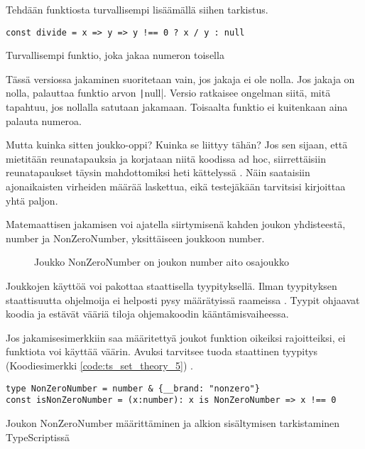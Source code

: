 Tehdään funktiosta turvallisempi lisäämällä siihen tarkistus.


\begin{code}
    \begin{verbatim}
const divide = x => y => y !== 0 ? x / y : null
\end{verbatim}
    \caption{Turvallisempi funktio, joka jakaa numeron toisella}
    \label{code:ts_set_theory_4}
\end{code}

Tässä versiossa jakaminen suoritetaan vain, jos jakaja ei ole nolla. Jos jakaja on nolla, palauttaa funktio arvon \texttt|null|. Versio ratkaisee ongelman siitä, mitä tapahtuu, jos nollalla satutaan jakamaan. Toisaalta funktio ei kuitenkaan aina palauta numeroa.

Mutta kuinka sitten joukko-oppi? Kuinka se liittyy tähän? Jos sen sijaan, että mietitään reunatapauksia ja korjataan niitä koodissa ad hoc, siirrettäisiin reunatapaukset täysin mahdottomiksi heti kättelyssä \cite{impossiblebetter}. Näin saataisiin ajonaikaisten virheiden määrää laskettua, eikä testejäkään tarvitsisi kirjoittaa yhtä paljon.

Matemaattisen jakamisen voi ajatella siirtymisenä kahden joukon yhdisteestä, number ja NonZeroNumber, yksittäiseen joukkoon number.

\begin{figure}[ht]
    \centering
    \caption{Joukko NonZeroNumber on joukon number aito osajoukko}
    \label{fig:set-esimerkki}
\end{figure}

Joukkojen käyttöä voi pakottaa staattisella tyypityksellä. Ilman tyypityksen staattisuutta ohjelmoija ei helposti pysy määrätyissä raameissa \cite[44]{cantarella_fp_haitat}. Tyypit ohjaavat koodia ja estävät vääriä tiloja ohjemakoodin kääntämisvaiheessa.

Jos jakamisesimerkkiin saa määritettyä joukot funktion oikeiksi rajoitteiksi, ei funktiota voi käyttää väärin. Avuksi tarvitsee tuoda staattinen tyypitys   (Koodiesimerkki \ref{code:ts_set_theory_5}) \cite{typsecript_website}.

\begin{code}
    \begin{verbatim}
type NonZeroNumber = number & {__brand: "nonzero"}
const isNonZeroNumber = (x:number): x is NonZeroNumber => x !== 0
\end{verbatim}
    \caption{Joukon NonZeroNumber määrittäminen ja alkion sisältymisen tarkistaminen TypeScriptissä}
    \label{code:ts_set_theory_5}
\end{code}

